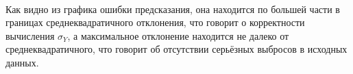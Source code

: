 \documentclass[11pt]{article}
\begin{document}
    \begin{center}
    \end{center}
    { \hspace*{\fill} \\}
    
    Как видно из графика ошибки предсказания, она находится по большей части
в границах среднеквадратичного отклонения, что говорит о корректности
вычисления \(\sigma_{Y}\), а максимальное отклонение находится не далеко
от среднеквадратичного, что говорит об отсутствии серьёзных выбросов в
исходных данных.


    
    
    
\end{document}
